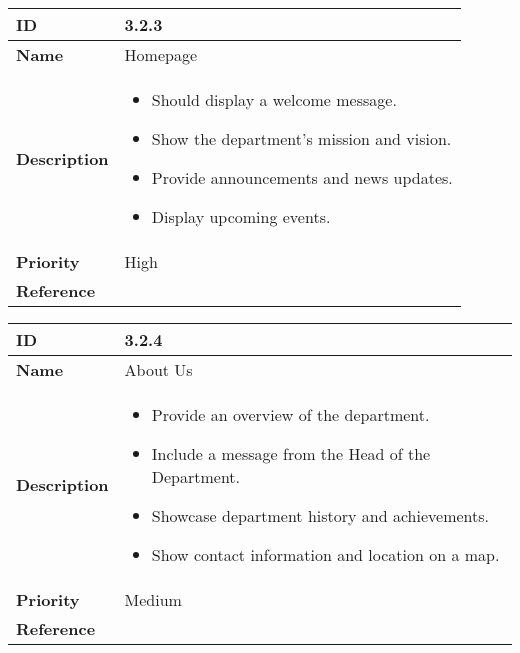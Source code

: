 \begin{center}
\begin{tabular}{ | >{\bfseries}m{5em} | m{10cm} |  } 
  \hline
  ID & 3.2.3\\  
  \hline
  Name & Homepage \\  
  \hline
  Description & 
  \begin{itemize}
      \item Should display a welcome message.
      \item Show the department’s mission and vision.
      \item Provide announcements and news updates.
      \item Display upcoming events.
  \end{itemize} \\ 
  \hline
  Priority & High\\
  \hline 
  Reference & \\
  \hline
\end{tabular}
\end{center}

\vspace{0.5cm}


\begin{center}
\begin{tabular}{ | >{\bfseries}m{5em} | m{10cm} |  } 
  \hline
  ID & 3.2.4\\  
  \hline
  Name & About Us \\  
  \hline
  Description & 
  \begin{itemize}
      \item Provide an overview of the department.
      \item Include a message from the Head of the Department.
      \item Showcase department history and achievements.
      \item Show contact information and location on a map.
  \end{itemize} \\ 
  \hline
  Priority & Medium\\
  \hline 
  Reference & \\
  \hline
\end{tabular}
\end{center}

\vspace{0.5cm}


